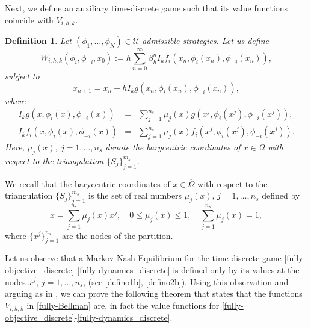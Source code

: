 \documentclass[12pt]{article}
\newtheorem{definition}{Definition}
\begin{document}
Next, we define an auxiliary time-discrete game such that its value functions coincide with $V_{i,h,k}$.


\begin{definition}
Let $(\phi_1,\dots,\phi_N)\in \mathcal{U}$ admissible strategies. Let us define
\begin{equation}
W_{i,h,k}(\phi_i,\phi_{-i},x_0):=h\sum_{n=0}^\infty \beta_h^n I_kf_i(x_n,\phi_i(x_n),\phi_{-i}(x_n)), \label{fully-objective_discrete}
\end{equation}
subject to
\begin{equation}\label{fully-dynamics_discrete}
x_{n+1}=x_n+hI_kg(x_n,\phi_i(x_n),\phi_{-i}(x_n)),
\end{equation}
where
\begin{eqnarray}\label{defino1b}
I_kg(x,\phi_i(x),\phi_{-i}(x))&=&\sum_{j=1}^{n_s}\mu_j(x)g(x^j,\phi_i(x^j),\phi_{-i}(x^j)),\\
I_kf_i(x,\phi_i(x),\phi_{-i}(x))&=&\sum_{j=1}^{n_s}\mu_j(x)f_i(x^j,\phi_i(x^j),\phi_{-i}(x^j)).\label{defino2b}
\end{eqnarray}
Here, $\mu_j(x)$, $j=1,\dots,n_s$ denote the barycentric coordinates of $x\in\overline \Omega$ with respect to the triangulation $\{S_j\}_{j=1}^{m_s}$.
\end{definition}
We recall that the barycentric coordinates of $x \in\overline\Omega$ with respect to the triangulation $\{S_j\}_{j=1}^{m_s}$ is the set of real numbers $\mu_j(x)$, $j=1,\dots,n_s$ defined by
$$x=\sum_{j=1}^{n_s}\mu_j(x)x^j,\quad 0\le\mu_j(x)\le 1,\quad \sum_{j=1}^{n_s}\mu_j(x)=1,$$
where $\{x^j\}_{j=1}^{n_s}$ are the nodes of the partition.

Let us observe that a Markov Nash Equilibrium for the time-discrete game \eqref{fully-objective_discrete}-\eqref{fully-dynamics_discrete} is defined only by its values at the nodes $x^j$, $j=1,\ldots,n_s$, (see \eqref{defino1b}, \eqref{defino2b}). Using this observation and arguing as in \cite[Theorem 3]{Javier_yo}, we can prove the following theorem that states that the functions $V_{i,h,k}$  in \eqref{fully-Bellman} are, in fact the value functions for \eqref{fully-objective_discrete}-\eqref{fully-dynamics_discrete}.
\end{document}

